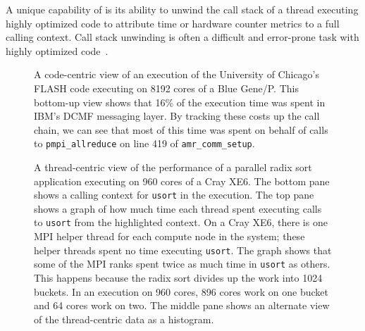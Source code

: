 \documentclass[11pt,letterpaper]{report}
\begin{document}
A unique capability of \HPCToolkit{} is its ability to unwind the call stack of a thread executing highly optimized code to attribute  time or hardware counter metrics to a full calling context.
Call stack unwinding is often a difficult and error-prone task with highly optimized code~\cite{Tallent-MC-Fagan:2009:PLDI-hpctoolkit-binary-analysis}.

\begin{figure}[t]
\caption{A code-centric view of an execution of the University of Chicago's FLASH code executing on 8192 cores of a Blue Gene/P. This bottom-up view shows that 16\% of the execution time was spent in IBM's DCMF messaging layer. By tracking these costs up the call chain, we can see that most of this time   was spent on behalf of calls to {\tt pmpi\_allreduce} on line 419 of {\tt amr\_comm\_setup}.}
\label{fig:code-centric}
\end{figure}


\begin{figure}[t]
\caption{A thread-centric view of the performance of a parallel radix sort application executing on 960 cores of a Cray XE6. The bottom pane shows a calling context for {\tt usort} in the execution. The top pane shows a graph of how much time each thread spent executing calls to {\tt usort} from the   highlighted context.  On a Cray XE6, there is one MPI helper thread for each compute node in the system; these helper threads spent no time executing {\tt usort}. The graph shows that some of the MPI ranks spent twice as much time in {\tt usort} as others. This happens because the radix sort divides up the work into 1024 buckets. In an execution on 960 cores,  896 cores work on one bucket and 64 cores work on two. The middle pane shows an alternate view of the thread-centric data as a histogram.}
\label{fig:thread-centric}
\end{figure}
\end{document}
